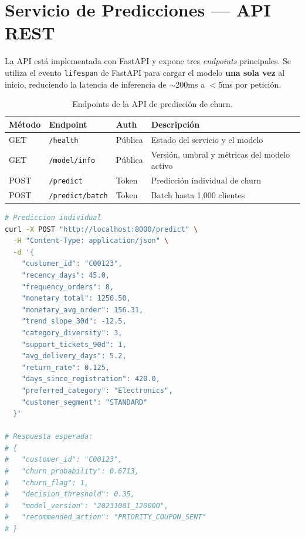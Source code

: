 \documentclass[12pt, letterpaper]{article}
\begin{document}
\section{Servicio de Predicciones — API REST}

La API está implementada con FastAPI \citep{ramirez2019fastapi} y expone
tres \textit{endpoints} principales. Se utiliza el evento \texttt{lifespan}
de FastAPI para cargar el modelo \textbf{una sola vez} al inicio, reduciendo
la latencia de inferencia de $\sim$200ms a $<$5ms por petición.

\begin{table}[H]
\centering
\caption{Endpoints de la API de predicción de churn.}
\label{tab:api}
\begin{tabular}{lllp{6cm}}
\toprule
\textbf{Método} & \textbf{Endpoint} & \textbf{Auth} & \textbf{Descripción} \\
\midrule
GET  & \texttt{/health}         & Pública & Estado del servicio y el modelo \\
GET  & \texttt{/model/info}     & Pública & Versión, umbral y métricas del modelo activo \\
POST & \texttt{/predict}        & Token   & Predicción individual de churn \\
POST & \texttt{/predict/batch}  & Token   & Batch hasta 1,000 clientes \\
\bottomrule
\end{tabular}
\end{table}

\begin{lstlisting}[language=bash, caption=Ejemplo de uso de la API (cURL)., label=lst:curl]
# Prediccion individual
curl -X POST "http://localhost:8000/predict" \
  -H "Content-Type: application/json" \
  -d '{
    "customer_id": "C00123",
    "recency_days": 45.0,
    "frequency_orders": 8,
    "monetary_total": 1250.50,
    "monetary_avg_order": 156.31,
    "trend_slope_30d": -12.5,
    "category_diversity": 3,
    "support_tickets_90d": 1,
    "avg_delivery_days": 5.2,
    "return_rate": 0.125,
    "days_since_registration": 420.0,
    "preferred_category": "Electronics",
    "customer_segment": "STANDARD"
  }'

# Respuesta esperada:
# {
#   "customer_id": "C00123",
#   "churn_probability": 0.6713,
#   "churn_flag": 1,
#   "decision_threshold": 0.35,
#   "model_version": "20231001_120000",
#   "recommended_action": "PRIORITY_COUPON_SENT"
# }
\end{lstlisting}
\end{document}
